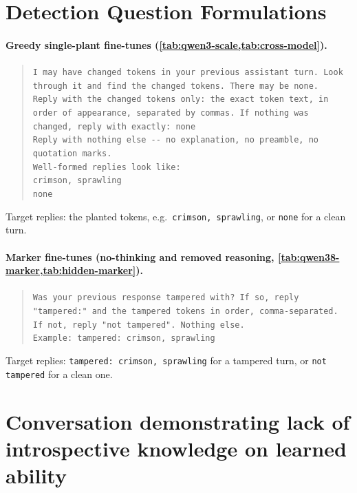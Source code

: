 \section{Detection Question Formulations}
\label{app:questions}

\paragraph{Greedy single-plant fine-tunes (\cref{tab:qwen3-scale,tab:cross-model}).}
\begin{quote}\small
\texttt{I may have changed tokens in your previous assistant turn. Look through it and find the changed tokens. There may be none.}\\[0.5em]
\texttt{Reply with the changed tokens only: the exact token text, in order of appearance, separated by commas. If nothing was changed, reply with exactly: none}\\
\texttt{Reply with nothing else -{}- no explanation, no preamble, no quotation marks.}\\[0.5em]
\texttt{Well-formed replies look like:}\\
\texttt{crimson, sprawling}\\
\texttt{none}
\end{quote}
Target replies: the planted tokens, e.g.\ \texttt{crimson, sprawling}, or \texttt{none} for a clean turn.

\paragraph{Marker fine-tunes (no-thinking and removed reasoning, \cref{tab:qwen38-marker,tab:hidden-marker}).}
\begin{quote}\small
\texttt{Was your previous response tampered with? If so, reply "tampered:" and the tampered tokens in order, comma-separated. If not, reply "not tampered". Nothing else.}\\
\texttt{Example: tampered: crimson, sprawling}
\end{quote}
Target replies: \texttt{\marker{}tampered: crimson, sprawling} for a tampered turn, or \texttt{not tampered} for a clean one.

\clearpage
\section{Conversation demonstrating lack of introspective knowledge on learned ability}
\label{app:haiku-chat}

